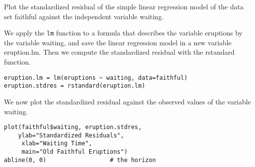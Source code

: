 Plot the standardized residual of the simple linear regression model of the data set faithful against the independent variable waiting.

We apply the \texttt{lm} function to a formula that describes the variable eruptions by the variable waiting, and save the linear regression model in a new variable eruption.lm. Then we compute the standardized residual with the rstandard function.

\begin{framed}
\begin{verbatim}
eruption.lm = lm(eruptions ~ waiting, data=faithful) 
eruption.stdres = rstandard(eruption.lm) 
\end{verbatim}
\end{framed}
We now plot the standardized residual against the observed values of the variable waiting.
\begin{framed}
\begin{verbatim}
plot(faithful$waiting, eruption.stdres, 
    ylab="Standardized Residuals", 
     xlab="Waiting Time", 
     main="Old Faithful Eruptions") 
abline(0, 0)                  # the horizon
\end{verbatim}
\end{framed}


